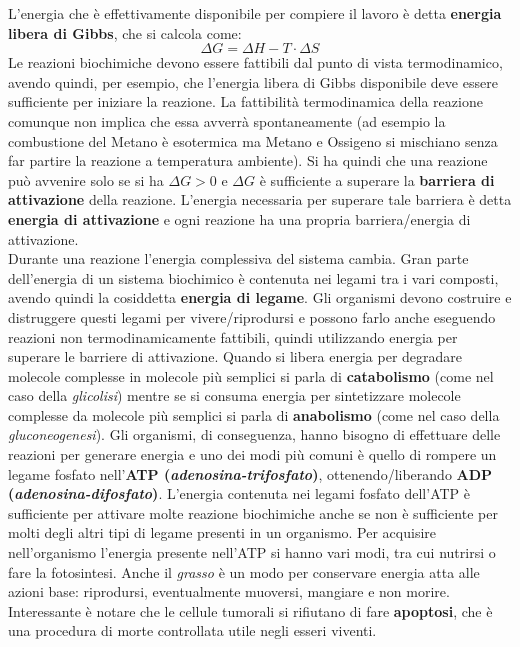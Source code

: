 \documentclass[a4paper,12pt, oneside]{book}
\begin{document}
L'energia che è effettivamente disponibile per compiere il lavoro è detta
\textbf{energia libera di Gibbs}, che si calcola come:
\[\Delta G=\Delta H-T\cdot \Delta S\]
Le reazioni biochimiche devono essere fattibili dal punto di vista
termodinamico, avendo quindi, per esempio, che l'energia libera di Gibbs
disponibile deve essere sufficiente per iniziare la reazione. La fattibilità
termodinamica della reazione comunque non implica che essa avverrà
spontaneamente (ad esempio la combustione del Metano è esotermica ma Metano e
Ossigeno si mischiano senza far partire la reazione a temperatura ambiente). Si
ha quindi che una reazione può avvenire solo se si ha $\Delta G>0$ e $\Delta G$
è sufficiente a superare la \textbf{barriera di attivazione} della
reazione. L'energia necessaria per superare tale barriera è detta
\textbf{energia di attivazione} e ogni reazione ha una propria barriera/energia
di attivazione.\\
Durante una reazione l'energia complessiva del sistema cambia. Gran parte
dell'energia di un sistema biochimico è contenuta nei legami tra i vari
composti, avendo quindi la cosiddetta \textbf{energia di legame}. Gli organismi
devono costruire e distruggere questi legami per vivere/riprodursi e possono
farlo anche eseguendo reazioni non termodinamicamente fattibili, quindi
utilizzando energia per superare le barriere di attivazione. Quando si libera
energia per degradare molecole complesse in molecole più semplici si parla di
\textbf{catabolismo} (come nel caso della \textit{glicolisi}) mentre se si
consuma energia per sintetizzare molecole complesse da molecole più semplici si
parla  di \textbf{anabolismo} (come nel caso della \textit{gluconeogenesi}). Gli
organismi, di 
conseguenza, hanno bisogno di effettuare delle reazioni per generare energia e
uno dei modi più comuni è quello di rompere un legame fosfato nell'\textbf{ATP
  (\textit{adenosina-trifosfato})}, ottenendo/liberando \textbf{ADP
(\textit{adenosina-difosfato})}. L'energia contenuta nei legami fosfato
dell'ATP è sufficiente per attivare molte reazione biochimiche anche se non è
sufficiente per molti degli altri tipi di legame presenti in
un organismo. Per acquisire nell'organismo l'energia presente nell'ATP si hanno
vari modi, tra cui nutrirsi o fare la fotosintesi. Anche il \textit{grasso} è un
modo per conservare energia atta alle azioni base: riprodursi, eventualmente
muoversi, mangiare e non morire. Interessante è notare che
le cellule tumorali si rifiutano di fare \textbf{apoptosi}, che è una procedura
di morte controllata utile negli esseri viventi.
\end{document}
